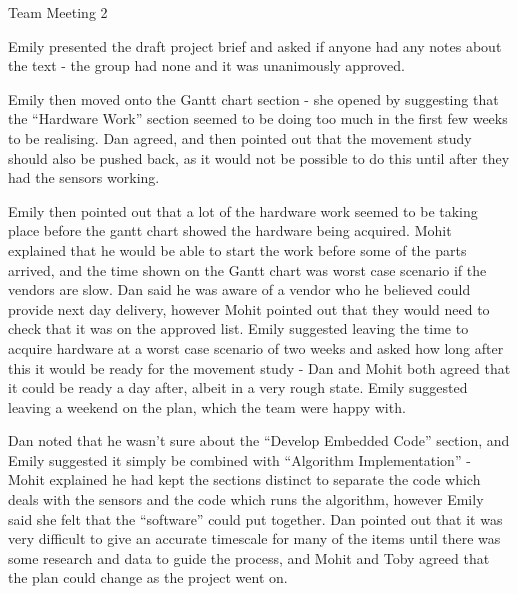 \documentclass{article}
\begin{document}

\begin{Minutes}{Team Meeting 2}
\maketitle


Emily presented the draft project brief and asked if anyone had any notes about the text -
the group had none and it was unanimously approved.

Emily then moved onto the Gantt chart section - she opened by suggesting that the ``Hardware Work''
section seemed to be doing too much in the first few weeks to be realising. Dan agreed, and then pointed
out that the movement study should also be pushed back, as it would not be possible to do this until
after they had the sensors working.

Emily then pointed out that a lot of the hardware work seemed to be
taking place before the gantt chart showed the hardware being acquired. Mohit explained that he would be
able to start the work before some of the parts arrived, and the time shown on the Gantt chart was
worst case scenario if the vendors are slow. Dan said he was aware of a vendor who he believed could
provide next day delivery, however Mohit pointed out that they would need to check that it was on the
approved list. Emily suggested leaving the time to acquire  hardware at a worst case scenario of two weeks
and asked how long after this it would be ready for the movement study - Dan and Mohit both agreed that
it could be ready a day after, albeit in a very rough state. Emily suggested leaving a weekend on the
plan, which the team were happy with.

Dan noted that he wasn't sure about the ``Develop Embedded Code'' section, and Emily suggested it simply
be combined with ``Algorithm Implementation'' - Mohit explained he had kept the sections distinct to
separate the code which deals with the sensors and the code which runs the algorithm, however Emily said
she felt that the ``software'' could put together. Dan pointed out that it was very difficult to give
an accurate timescale for many of the items until there was some research and data to guide the process, and
Mohit and Toby agreed that the plan could change as the project went on.


\end{Minutes}
\end{document}
